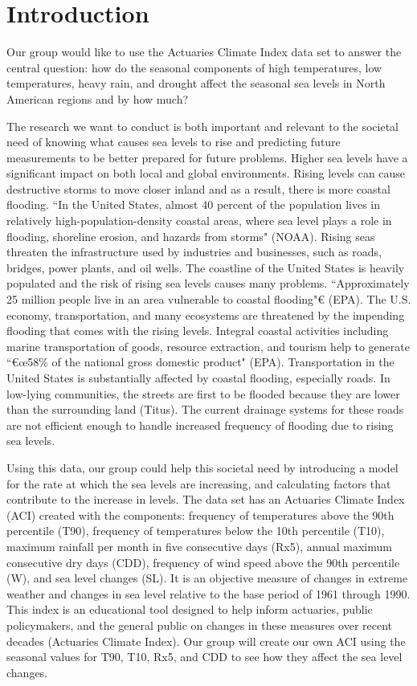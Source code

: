\documentclass[12pt]{report}
\begin{document}
\newpage
 \section* {Introduction} 
		
\indent	\par Our group would like to use the Actuaries Climate Index data set to answer the central question: how do the seasonal components of high temperatures, low temperatures, heavy rain, and drought affect the seasonal sea levels in North American regions and by how much?
		\par The research we want to conduct is both important and relevant to the societal need of knowing what causes sea levels to rise and predicting future measurements to be better prepared for future problems. Higher sea levels have a significant impact on both local and global environments. Rising levels can cause destructive storms to move closer inland and as a result, there is more coastal flooding. \textquotedblleft In the United States, almost 40 percent of the population lives in relatively high-population-density coastal areas, where sea level plays a role in flooding, shoreline erosion, and hazards from storms" (NOAA). Rising seas threaten the infrastructure used by industries and businesses, such as roads, bridges, power plants, and oil wells. The coastline of the United States is heavily populated and the risk of rising sea levels causes many problems. \textquotedblleft Approximately 25 million people live in an area vulnerable to coastal flooding"€ (EPA). The U.S. economy, transportation, and many ecosystems are threatened by the impending flooding that comes with the rising levels. Integral coastal activities including marine transportation of goods, resource extraction, and tourism help to generate \textquotedblleft€œ58\% of the national gross domestic product" (EPA). Transportation in the United States is substantially affected by coastal flooding, especially roads. In low-lying communities, the streets are first to be flooded because they are lower than the surrounding land (Titus). The current drainage systems for these roads are not efficient enough to handle increased frequency of flooding due to rising sea levels. 
		\par Using this data, our group could help this societal need by introducing a model for the rate at which the sea levels are increasing, and calculating factors that contribute to the increase in levels. The data set has an Actuaries Climate Index (ACI) created with the components: frequency of temperatures above the 90th percentile (T90), frequency of temperatures below the 10th percentile (T10), maximum rainfall per month in five consecutive days (Rx5), annual maximum consecutive dry days (CDD), frequency of wind speed above the 90th percentile (W), and sea level changes (SL). It is an objective measure of changes in extreme weather and changes in sea level relative to the base period of 1961 through 1990. This index is an educational tool designed to help inform actuaries, public policymakers, and the general public on changes in these measures over recent decades (Actuaries Climate Index). Our group will create our own ACI using the seasonal values for T90, T10, Rx5, and CDD to see how they affect the sea level changes. 
\end{document}
